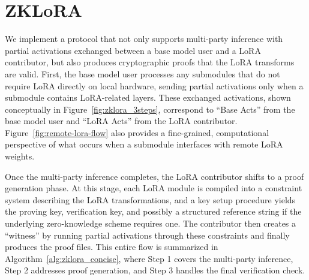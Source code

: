 \documentclass[11pt]{article}
\begin{document}
\section{ZKLoRA}
We implement a protocol that not only supports multi-party inference with partial activations exchanged between a base model user and a LoRA contributor, but also produces cryptographic proofs that the LoRA transforms are valid. First, the base model user processes any submodules that do not require LoRA directly on local hardware, sending partial activations only when a submodule contains LoRA-related layers. These exchanged activations, shown conceptually in Figure~\ref{fig:zklora_3steps}, correspond to “Base Acts” from the base model user and “LoRA Acts” from the LoRA contributor. Figure~\ref{fig:remote-lora-flow} also provides a fine-grained, computational perspective of what occurs when a submodule interfaces with remote LoRA weights.

Once the multi-party inference completes, the LoRA contributor shifts to a proof generation phase. At this stage, each LoRA module is compiled into a constraint system describing the LoRA transformations, and a key setup procedure yields the proving key, verification key, and possibly a structured reference string if the underlying zero-knowledge scheme requires one. The contributor then creates a “witness” by running partial activations through these constraints and finally produces the proof files. This entire flow is summarized in Algorithm~\ref{alg:zklora_concise}, where Step 1 covers the multi-party inference, Step 2 addresses proof generation, and Step 3 handles the final verification check.
\end{document}

